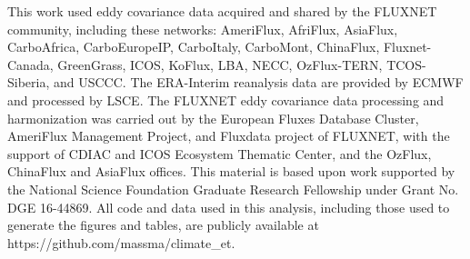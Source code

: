 \documentclass[draft,linenumbers]{agujournal}
\begin{document}
\acknowledgments This work used eddy covariance data acquired and
shared by the FLUXNET community, including these networks: AmeriFlux,
AfriFlux, AsiaFlux, CarboAfrica, CarboEuropeIP, CarboItaly, CarboMont,
ChinaFlux, Fluxnet-Canada, GreenGrass, ICOS, KoFlux, LBA, NECC,
OzFlux-TERN, TCOS-Siberia, and USCCC. The ERA-Interim reanalysis data
are provided by ECMWF and processed by LSCE. The FLUXNET eddy
covariance data processing and harmonization was carried out by the
European Fluxes Database Cluster, AmeriFlux Management Project, and
Fluxdata project of FLUXNET, with the support of CDIAC and ICOS
Ecosystem Thematic Center, and the OzFlux, ChinaFlux and AsiaFlux
offices. This material is based upon work supported by the National
Science Foundation Graduate Research Fellowship under Grant No. DGE
16-44869. All code and data used in this analysis, including those
used to generate the figures and tables, are publicly available at
https://github.com/massma/climate\_et.



\end{document}
